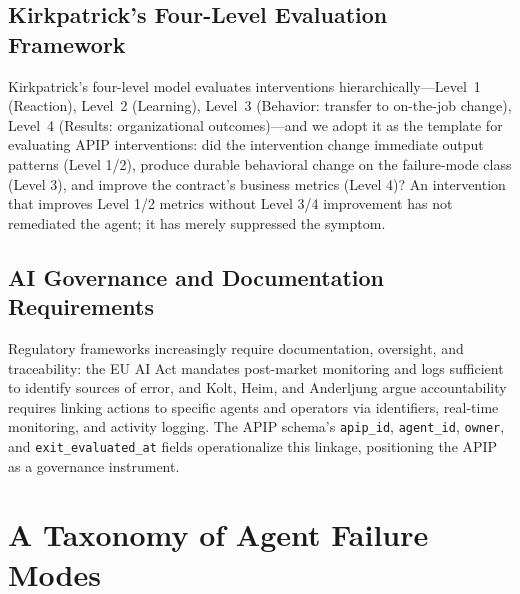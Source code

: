 \documentclass[conference]{IEEEtran}
\newcommand{\code}[1]{\texttt{\small #1}}
\begin{document}
\subsection{Kirkpatrick's Four-Level Evaluation Framework}
\label{sec:kirkpatrick}

Kirkpatrick's four-level model \cite{kirkpatrick1994, kirkpatrick2016}
evaluates interventions hierarchically---Level~1 (Reaction), Level~2
(Learning), Level~3 (Behavior: transfer to on-the-job change), Level~4
(Results: organizational outcomes)---and we adopt it as the template for
evaluating APIP interventions: did the intervention change immediate output
patterns (Level 1/2), produce durable behavioral change on the failure-mode
class (Level 3), and improve the contract's business metrics (Level 4)? An
intervention that improves Level 1/2 metrics without Level 3/4 improvement has
not remediated the agent; it has merely suppressed the symptom.

\subsection{AI Governance and Documentation Requirements}
\label{sec:governance}

Regulatory frameworks increasingly require documentation, oversight, and
traceability: the EU AI Act \cite{euaiact} mandates post-market monitoring and
logs sufficient to identify sources of error, and Kolt, Heim, and Anderljung
\cite{kolt2024} argue accountability requires linking actions to specific
agents and operators via identifiers, real-time monitoring, and activity
logging. The APIP schema's \code{apip\_id}, \code{agent\_id}, \code{owner}, and
\code{exit\_evaluated\_at} fields operationalize this linkage, positioning the
APIP as a governance instrument.

\section{A Taxonomy of Agent Failure Modes}
\label{sec:taxonomy}
\end{document}
